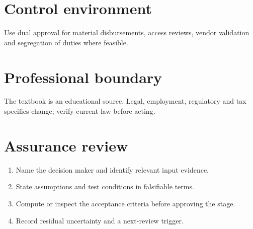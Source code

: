 \documentclass[11pt]{article}
\begin{document}
\section{Control environment}
Use dual approval for material disbursements, access reviews, vendor validation and segregation of duties where feasible.
\section{Professional boundary}
The textbook is an educational source. Legal, employment, regulatory and tax specifics change; verify current law before acting.
\section{Assurance review}
\begin{enumerate}[leftmargin=*,itemsep=5pt]
\item Name the decision maker and identify relevant input evidence.
\item State assumptions and test conditions in falsifiable terms.
\item Compute or inspect the acceptance criteria before approving the stage.
\item Record residual uncertainty and a next-review trigger.
\end{enumerate}
\end{document}
